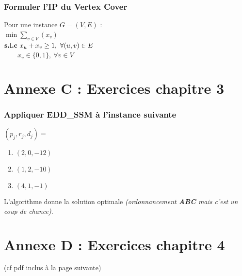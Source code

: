 \documentclass[12pt]{article}
\newcommand{\titre}[1]{\textcolor{title}{#1}}
\begin{document}
\subsubsection*{Formuler l'\titre{IP} du Vertex Cover}

Pour une instance $G=(V,E)$ :\\

$\min \sum_{v\in V} (x_v)$\\
\indent $\text{\textbf{s.l.c} } x_u + x_v \geq 1,\ \forall (u,v) \in E$\\
\indent $\qquad x_v \in \{0,1\},\ \forall v\in V$

\begin{center}\end{center}



\section{Annexe C : Exercices chapitre 3}\label{exoChap3}

\subsubsection*{Appliquer \textbf{EDD\_SSM} à l'instance suivante}
$(p_j,r_j,d_j) =$
\begin{enumerate}
\item $(2,0,-12)$
\item $(1,2,-10)$
\item $(4,1,-1)$
\end{enumerate}
L'algorithme donne la solution optimale \textit{(ordonnancement \textbf{ABC} mais c'est un coup de chance)}.



\section{Annexe D : Exercices chapitre 4}\label{exoChap4}

(cf pdf inclus à la page suivante)

\begin{center}\end{center}
\end{document}

